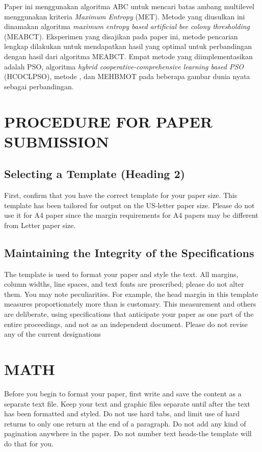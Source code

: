 \documentclass[a4paper, 10pt, conference]{ieeeconf}
\begin{document}
Paper ini menggunakan algoritma ABC untuk mencari batas ambang multilevel menggunakan kriteria \textit{Maximum Entropy} (MET). Metode yang diusulkan ini dinamakan algoritma \textit{maximum entropy based artificial bee colony thresholding }(MEABCT). Eksperimen yang disajikan pada paper ini, metode pencarian lengkap dilakukan untuk mendapatkan hasil yang optimal untuk perbandingan dengan hasil dari algoritma MEABCT. Empat metode yang diimplementasikan adalah PSO, algoritma \textit{hybrid cooperative-comprehensive learning based PSO} (HCOCLPSO), metode , dan MEHBMOT pada beberapa gambar dunia nyata sebagai perbandingan.


\section{PROCEDURE FOR PAPER SUBMISSION}

\subsection{Selecting a Template (Heading 2)}

First, confirm that you have the correct template for your paper size. This template has been tailored for output on the US-letter paper size. Please do not use it for A4 paper since the margin requirements for A4 papers may be different from Letter paper size.

\subsection{Maintaining the Integrity of the Specifications}

The template is used to format your paper and style the text. All margins, column widths, line spaces, and text fonts are prescribed; please do not alter them. You may note peculiarities. For example, the head margin in this template measures proportionately more than is customary. This measurement and others are deliberate, using specifications that anticipate your paper as one part of the entire proceedings, and not as an independent document. Please do not revise any of the current designations

\section{MATH}

Before you begin to format your paper, first write and save the content as a separate text file. Keep your text and graphic files separate until after the text has been formatted and styled. Do not use hard tabs, and limit use of hard returns to only one return at the end of a paragraph. Do not add any kind of pagination anywhere in the paper. Do not number text heads-the template will do that for you.
\end{document}
